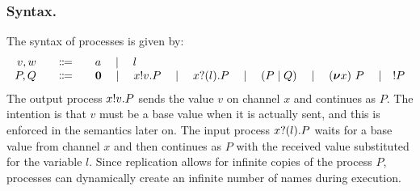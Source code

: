 \documentclass[runningheads]{llncs}
\begin{document}
\subsubsection{Syntax.}
The syntax of processes is given by:
\begin{displaymath}
  \begin{array}{r@{\qquad}c@{\qquad}l}
    v,w & \Coloneqq & a \quad\mid\quad l \\
    P,Q & \Coloneqq & \Pend
               \quad \mid\quad \Pout{x}{v}{P}
               \quad \mid\quad \Pin{x}{l}{P}
               \quad \mid\quad \PBpar{P}{Q}
               \quad \mid\quad \Pres{x}{}{P}
               \quad \mid\quad !P
  \end{array}
\end{displaymath}
The output process \( x ! v . P \) sends the value \( v \) on channel \( x \) and continues as \( P \).
The intention is that \( v \) must be a base value when it is actually sent, and this is enforced in the semantics later on.
The input process \( x ? (l) . P \) waits for a base value from channel \( x \) and then continues as \( P \) with the received value substituted for the variable \( l \).
Since replication allows for infinite copies of the process $P$, processes can dynamically
create an infinite number of names during execution.
\end{document}

